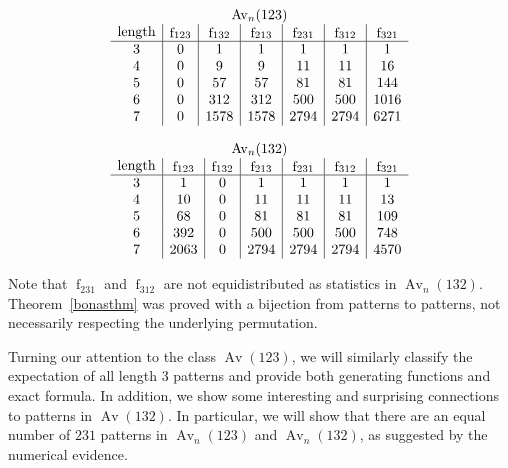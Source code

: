 \documentclass[11pt]{article} %
\theoremstyle{plain}
\theoremstyle{definition}
\newcommand{\Avn}{\Av_n(123)}
\newcommand{\Avnn}{\Av_n (132)}
\DeclareMathOperator{\Av}{Av}
\DeclareMathOperator{\num}{f}
\begin{document}
  $$
  \begin{array}{c|c|c|c|c|c|c}
      \multicolumn{7}{c}{\Avn } \\
      \text{length} & \num_{123} & \num_{132} & \num_{213}
      & \num_{231} & \num_{312} & \num_{321} \\
      \hline
      3  & 0     &    1  &    1 &    1 &    1 &    1  \\
      4  & 0     &    9  &    9 &   11 &   11 &   16  \\
      5  & 0     &    57 &   57 &   81 &   81 &  144  \\
      6  & 0     &   312 &  312 &  500 &  500 & 1016  \\
      7  & 0     &  1578 & 1578 & 2794 & 2794 & 6271
    \end{array}
  $$

  \vspace{1pc}

  $$
  \begin{array}{c|c|c|c|c|c|c}
      \multicolumn{7}{c}{\Avnn } \\
      \text{length} & \num_{123} & \num_{132} & \num_{213}
      & \num_{231} & \num_{312} & \num_{321} \\
      \hline
     3  & 1     &    0  &    1 &    1 &    1 &    1  \\
     4  & 10    &    0  &   11 &   11 &   11 &   13  \\
     5  & 68    &    0  &   81 &   81 &   81 &  109  \\
     6  & 392   &    0  &  500 &  500 &  500 &  748  \\
     7  & 2063  &    0  & 2794 & 2794 & 2794 & 4570
   \end{array}
  $$
  \vspace{1pc}

  Note that $\num_{231}$ and $\num_{312}$ are not
  equidistributed as statistics in $\Avnn$. Theorem~\ref{bonasthm}
  was proved with a bijection from patterns to patterns, not
  necessarily respecting the underlying permutation.

  Turning our attention to the class $\Av(123)$, we will similarly
  classify the expectation of all length $3$ patterns and provide both
  generating functions and exact formula. In addition, we show some
  interesting and surprising connections to patterns in $\Av(132)$. In
  particular, we will show that there are an equal number of $231$
  patterns in $\Avn$ and $\Avnn$, as suggested by the numerical
  evidence.
\end{document}
